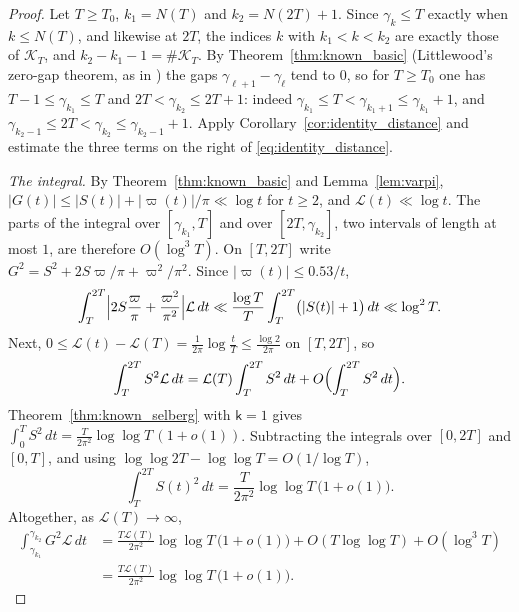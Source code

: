 \documentclass[11pt,a4paper]{article}
\makeatletter
\numberwithin{equation}{section}
\DeclareRobustCommand{\CGref}[1]{\ref{#1}}
\DeclareRobustCommand{\CGeqref}[1]{\eqref{#1}}
\DeclareRobustCommand{\CGcite}[2][]{\if\relax\detokenize{#1}\relax\cite{#2}\else\cite[#1]{#2}\fi}
\let\CG@origref\ref
\let\CG@origeqref\eqref
\newcommand{\CG@gettip}[1]{\@ifundefined{CGTip@#1}{#1}{\csname CGTip@#1\endcsname}}
\newcommand{\CG@getbib}[1]{\@ifundefined{CGBib@#1}{#1}{\csname CGBib@#1\endcsname}}
\DeclareRobustCommand{\CGref}[1]{\pdftooltip{\CG@origref{#1}}{\CG@gettip{#1}}}
\DeclareRobustCommand{\CGeqref}[1]{\pdftooltip{\CG@origeqref{#1}}{\CG@gettip{#1}}}
\DeclareRobustCommand{\CGcite}[2][]{\pdftooltip{\if\relax\detokenize{#1}\relax\cite{#2}\else\cite[#1]{#2}\fi}{\CG@getbib{#2}}}
\theoremstyle{definition}
\theoremstyle{remark}
\newcommand{\lL}{\mathcal L}
\newcommand{\Kc}{\mathcal K}
\makeatother
\begin{document}
\begin{proof}
Let $T\ge T_0$, $k_1=N(T)$ and $k_2=N(2T)+1$. Since $\gamma_k\le T$ exactly when $k\le N(T)$, and likewise at $2T$, the indices $k$ with $k_1<k<k_2$ are exactly those of $\Kc_T$, and $k_2-k_1-1=\#\Kc_T$. By Theorem~\CGref{thm:known_basic} (Littlewood's zero-gap theorem, as in \CGcite[Thm.~9.12]{Titchmarsh1986}) the gaps $\gamma_{\ell+1}-\gamma_\ell$ tend to $0$, so for $T\ge T_0$ one has $T-1\le\gamma_{k_1}\le T$ and $2T<\gamma_{k_2}\le2T+1$: indeed $\gamma_{k_1}\le T<\gamma_{k_1+1}\le\gamma_{k_1}+1$, and $\gamma_{k_2-1}\le2T<\gamma_{k_2}\le\gamma_{k_2-1}+1$. Apply Corollary~\CGref{cor:identity_distance} and estimate the three terms on the right of \CGeqref{eq:identity_distance}.

\emph{The integral.} By Theorem~\CGref{thm:known_basic} and Lemma~\CGref{lem:varpi}, $|G(t)|\le|S(t)|+|\varpi(t)|/\pi\ll\log t$ for $t\ge2$, and $\lL(t)\ll\log t$. The parts of the integral over $[\gamma_{k_1},T]$ and over $[2T,\gamma_{k_2}]$, two intervals of length at most $1$, are therefore $O(\log^3T)$. On $[T,2T]$ write $G^2=S^2+2S\varpi/\pi+\varpi^2/\pi^2$. Since $|\varpi(t)|\le0.53/t$,
\begin{equation}
\int_T^{2T}\Bigl|2S\frac\varpi\pi+\frac{\varpi^2}{\pi^2}\Bigr|\lL\,dt\ll\frac{\log T}{T}\int_T^{2T}\bigl(|S(t)|+1\bigr)\,dt\ll\log^2T .
\label{eq:disp_30}
\end{equation}
Next, $0\le\lL(t)-\lL(T)=\frac1{2\pi}\log\frac tT\le\frac{\log2}{2\pi}$ on $[T,2T]$, so
\begin{equation}
\int_T^{2T}S^2\lL\,dt=\lL(T)\int_T^{2T}S^2\,dt+O\Bigl(\int_T^{2T}S^2\,dt\Bigr).
\label{eq:disp_31}
\end{equation}
Theorem~\CGref{thm:known_selberg} with $\mathsf k=1$ gives $\int_0^TS^2\,dt=\frac{T}{2\pi^2}\log\log T\,(1+o(1))$. Subtracting the integrals over $[0,2T]$ and $[0,T]$, and using $\log\log2T-\log\log T=O(1/\log T)$,
\begin{equation}
\int_T^{2T}S(t)^2\,dt=\frac{T}{2\pi^2}\log\log T\,\bigl(1+o(1)\bigr).
\label{eq:selberg_dyadic}
\end{equation}
Altogether, as $\lL(T)\to\infty$,
\begin{equation}
\begin{aligned}
\int_{\gamma_{k_1}}^{\gamma_{k_2}}G^2\lL\,dt&=\frac{T\lL(T)}{2\pi^2}\log\log T\,\bigl(1+o(1)\bigr)+O(T\log\log T)+O(\log^3T)\\
&=\frac{T\lL(T)}{2\pi^2}\log\log T\,\bigl(1+o(1)\bigr).
\end{aligned}
\label{eq:disp_32}
\end{equation}


\end{proof}
\end{document}
